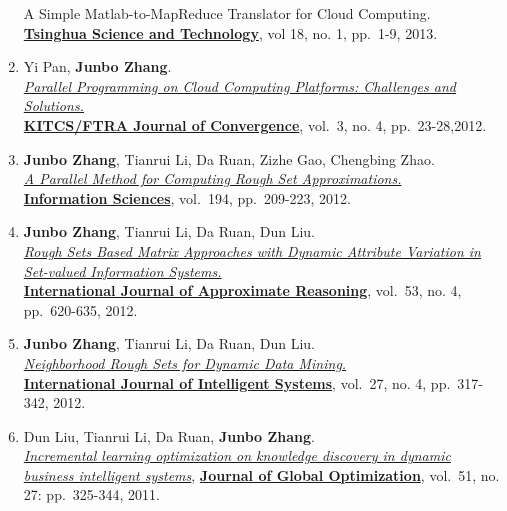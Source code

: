 \documentclass[]{article}
\begin{document}
\begin{enumerate}
{{  A Simple Matlab-to-MapReduce Translator for Cloud Computing.}}\\
  \href{http://qhxb.lib.tsinghua.edu.cn/english/}{\textbf{Tsinghua
  Science and Technology}}, vol 18, no. 1, pp.~1-9, 2013.
\item
  Yi Pan, \textbf{Junbo Zhang}.\\
  \href{http://www.ftrai.org/xe/index.php?mid=joc_published\&category=37964\&search_keyword=section\&search_target=title\&document_srl=38459}{\emph{Parallel
  Programming on Cloud Computing Platforms: Challenges and
  Solutions.}}\\ \href{http://www.ftrai.org/joc/}{\textbf{KITCS/FTRA
  Journal of Convergence}}, vol.~3, no. 4, pp.~23-28,2012.
\item
  \textbf{Junbo Zhang}, Tianrui Li, Da Ruan, Zizhe Gao, Chengbing
  Zhao.\\ \href{http://dx.doi.org/10.1016/j.ins.2011.12.036}{\emph{A
  Parallel Method for Computing Rough Set Approximations.}}\\
  \href{http://www.journals.elsevier.com/information-sciences}{\textbf{Information
  Sciences}}, vol.~194, pp.~209-223, 2012.
\item
  \textbf{Junbo Zhang}, Tianrui Li, Da Ruan, Dun Liu.\\
  \href{http://dx.doi.org/10.1016/j.ijar.2012.01.001}{\emph{Rough Sets
  Based Matrix Approaches with Dynamic Attribute Variation in Set-valued
  Information Systems.}}\\
  \href{http://www.journals.elsevier.com/international-journal-of-approximate-reasoning}{\textbf{International
  Journal of Approximate Reasoning}}, vol.~53, no. 4, pp.~620-635, 2012.
\item
  \textbf{Junbo Zhang}, Tianrui Li, Da Ruan, Dun Liu.\\
  \href{http://dx.doi.org/10.1002/int.21523}{\emph{Neighborhood Rough
  Sets for Dynamic Data Mining.}}\\
  \href{http://onlinelibrary.wiley.com/journal/10.1002/{[}ISSN{]}1098-111X}{\textbf{International
  Journal of Intelligent Systems}}, vol.~27, no. 4, pp.~317-342, 2012.
\item
  Dun Liu, Tianrui Li, Da Ruan, \textbf{Junbo Zhang}.\\
  \href{http://dx.doi.org/10.1007/s10898-010-9607-8}{\emph{Incremental
  learning optimization on knowledge discovery in dynamic business
  intelligent systems}},
  \href{http://www.springer.com/business+\%26+management/operations+research/journal/10898}{\textbf{Journal
  of Global Optimization}}, vol.~51, no. 27: pp.~325-344, 2011.
\end{enumerate}
\end{document}
